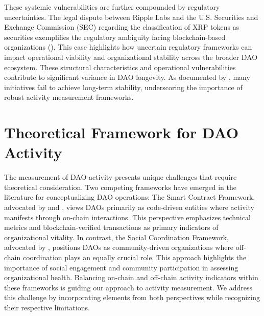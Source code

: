 These systemic vulnerabilities are further compounded by regulatory uncertainties. The legal dispute between Ripple Labs and the U.S. Securities and Exchange Commission (SEC) regarding the classification of XRP tokens as securities exemplifies the regulatory ambiguity facing blockchain-based organizations (\cite{hennelly2022cryptic}). This case highlights how uncertain regulatory frameworks can impact operational viability and organizational stability across the broader DAO ecosystem. These structural characteristics and operational vulnerabilities contribute to significant variance in DAO longevity. As documented by \textcite{alphaquest2024dead}, many initiatives fail to achieve long-term stability, underscoring the importance of robust activity measurement frameworks.

\section{Theoretical Framework for DAO Activity}
The measurement of DAO activity presents unique challenges that require theoretical consideration. Two competing frameworks have emerged in the literature for conceptualizing DAO operations:
The Smart Contract Framework, advocated by \textcite{jentzsch2016decentralized} and \textcite{de2018blockchain}, views DAOs primarily as code-driven entities where activity manifests through on-chain interactions. This perspective emphasizes technical metrics and blockchain-verified transactions as primary indicators of organizational vitality.
In contrast, the Social Coordination Framework, advocated by \textcite{hsieh2018bitcoin}, positions DAOs as community-driven organizations where off-chain coordination plays an equally crucial role. This approach highlights the importance of social engagement and community participation in assessing organizational health.
Balancing on-chain and off-chain activity indicators within these frameworks is guiding our approach to activity measurement.
We address this challenge by incorporating elements from both perspectives while recognizing their respective limitations.



